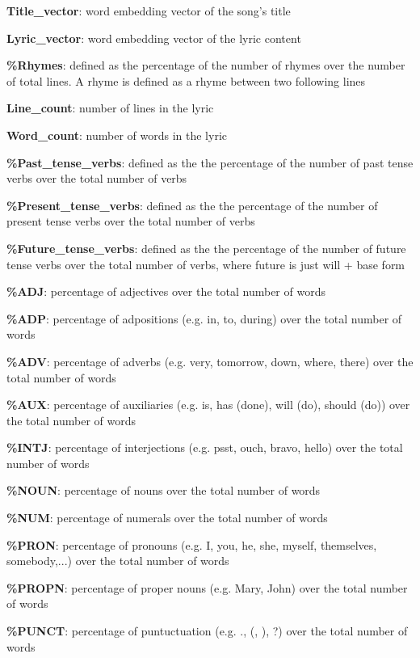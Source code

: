 \begin{description}
\item \textbf{Title\_vector}: word embedding vector of the song's title
\item \textbf{Lyric\_vector}: word embedding vector of the lyric content
\item \textbf{\%Rhymes}: defined as the percentage of the number of rhymes over the number of total lines. A rhyme is defined as a rhyme between two following lines
\item \textbf{Line\_count}: number of lines in the lyric
\item \textbf{Word\_count}: number of words in the lyric
\item \textbf{\%Past\_tense\_verbs}: defined as the the percentage of the number of past tense verbs over the total number of verbs
\item \textbf{\%Present\_tense\_verbs}: defined as the the percentage of the number of present tense verbs over the total number of verbs
\item \textbf{\%Future\_tense\_verbs}: defined as the the percentage of the number of future tense verbs over the total number of verbs, where future is just will + base form
\item \textbf{\%ADJ}: percentage of adjectives over the total number of words
\item \textbf{\%ADP}: percentage of adpositions (e.g. in, to, during) over the total number of words
\item \textbf{\%ADV}: percentage of adverbs (e.g. very, tomorrow, down, where, there) over the total number of words
\item \textbf{\%AUX}: percentage of auxiliaries (e.g. is, has (done), will (do), should (do)) over the total number of words
\item \textbf{\%INTJ}: percentage of interjections (e.g. psst, ouch, bravo, hello) over the total number of words
\item \textbf{\%NOUN}: percentage of nouns over the total number of words
\item \textbf{\%NUM}: percentage of numerals over the total number of words
\item \textbf{\%PRON}: percentage of pronouns (e.g. I, you, he, she, myself, themselves, somebody,...) over the total number of words
\item \textbf{\%PROPN}: percentage of proper nouns (e.g. Mary, John) over the total number of words
\item \textbf{\%PUNCT}: percentage of puntuctuation (e.g. ., (, ), ?) over the total number of words

\end{description}
